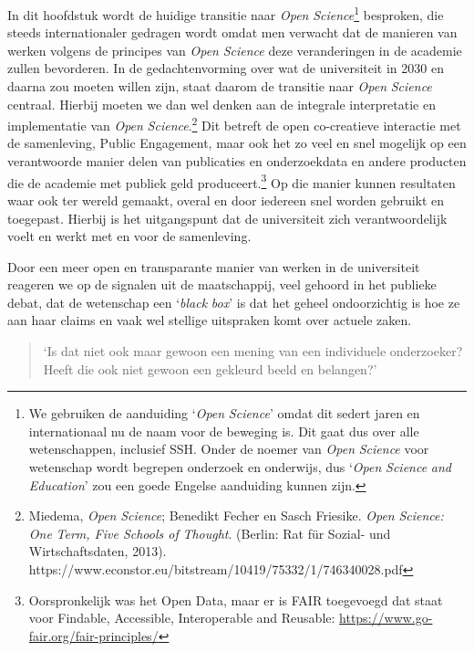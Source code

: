 \documentclass[smallauthor, chapterhaspagenum, nochapterinheader, pagenuminheader,  bigchapnum,medium2, tocpages,  garamond, titleinheader]{jote-book}
\begin{document}
	In dit hoofdstuk wordt de huidige transitie naar \emph{Open }\emph{Science}\footnote{We gebruiken de aanduiding ‘\emph{Open }\emph{Science}' omdat dit sedert jaren en internationaal nu de naam voor de beweging is. Dit gaat dus over alle wetenschappen, inclusief SSH. Onder de noemer van \emph{Open }\emph{Science} voor wetenschap wordt begrepen onderzoek en onderwijs, dus ‘\emph{Open }\emph{Science}\emph{ }\emph{and}\emph{ }\emph{Education}' zou een goede Engelse aanduiding kunnen zijn.} besproken, die steeds internationaler gedragen wordt omdat men verwacht dat de manieren van werken volgens de principes van \emph{Open }\emph{Science} deze veranderingen in de academie zullen bevorderen. In de gedachtenvorming over wat de universiteit in 2030 en daarna zou moeten willen zijn, staat daarom de transitie naar \emph{Open }\emph{Science} centraal. Hierbij moeten we dan wel denken aan de integrale interpretatie en implementatie van \emph{Open }\emph{Science}.\footnote{Miedema, \emph{Open }\emph{Science}; Benedikt Fecher en Sasch Friesike. \emph{Open }\emph{Science}\emph{: }\emph{One}\emph{ Term, Five Schools of }\emph{Thought}. (Berlin: Rat für Sozial- und Wirtschaftsdaten, 2013). https://www.econstor.eu/bitstream/10419/75332/1/746340028.pdf} Dit betreft de open co-creatieve interactie met de samenleving, Public Engagement, maar ook het zo veel en snel mogelijk op een verantwoorde manier delen van publicaties en onderzoekdata en andere producten die de academie met publiek geld produceert.\footnote{Oorspronkelijk was het Open Data, maar er is FAIR toegevoegd dat staat voor Findable, Accessible, Interoperable and Reusable: \href{https://www.go-fair.org/fair-principles/}{https://www.go-fair.org/fair-principles/}} Op die manier kunnen resultaten waar ook ter wereld gemaakt, overal en door iedereen snel worden gebruikt en toegepast. Hierbij is het uitgangspunt dat de universiteit zich verantwoordelijk voelt en werkt met en voor de samenleving.



	Door een meer open en transparante manier van werken in de universiteit reageren we op de signalen uit de maatschappij, veel gehoord in het publieke debat, dat de wetenschap een ‘\emph{black}\emph{ }\emph{box}' is dat het geheel ondoorzichtig is hoe ze aan haar claims en vaak wel stellige uitspraken komt over actuele zaken.\emph{ }

	\begin{quote}
		\itshape

		‘Is dat niet ook maar gewoon een mening van een individuele onderzoeker? Heeft die ook niet gewoon een gekleurd beeld en belangen?'
	\end{quote}
\end{document}
